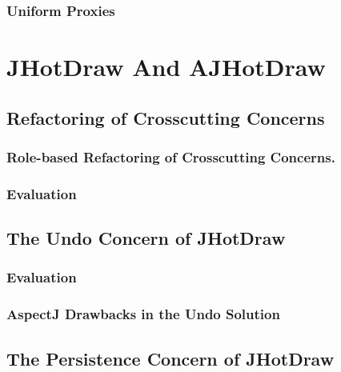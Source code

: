 \subsubsection{Uniform Proxies}\label{Uniform Proxies}

\section{JHotDraw And AJHotDraw}\label{JHotDraw And AJHotDraw}

\subsection{Refactoring of Crosscutting Concerns}

\subsubsection{Role-based Refactoring of Crosscutting Concerns.}

\subsubsection{Evaluation}

\subsection{The Undo Concern of JHotDraw}

\subsubsection{Evaluation}

\subsubsection{AspectJ Drawbacks in the Undo Solution}

\subsection{The Persistence Concern of JHotDraw}
